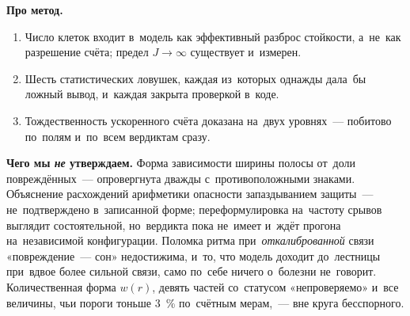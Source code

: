 \documentclass[11pt,a4paper,landscape,twocolumn]{article}
\begin{document}
\textbf{Про метод.}
\begin{enumerate}[leftmargin=1.3em,itemsep=2pt,topsep=2pt,resume]
\item Число клеток входит в~модель как эффективный разброс стойкости, а~не~как разрешение счёта; предел $J\to\infty$ существует и~измерен.
\item Шесть статистических ловушек, каждая из~которых однажды дала~бы ложный вывод, и~каждая закрыта проверкой в~коде.
\item Тождественность ускоренного счёта доказана на~двух уровнях~— побитово по~полям и~по~всем вердиктам сразу.
\end{enumerate}

\textbf{Чего мы \emph{не} утверждаем.} Форма зависимости ширины полосы от~доли повреждённых~— опровергнута дважды с~противоположными знаками. Объяснение расхождений арифметики опасности запаздыванием защиты~— не~подтверждено в~записанной форме; переформулировка на~частоту срывов выглядит состоятельной, но~вердикта пока не~имеет и~ждёт прогона на~независимой конфигурации. Поломка ритма при~\emph{откалиброванной} связи «повреждение~— сон» недостижима, и~то, что модель доходит до~лестницы при~вдвое более сильной связи, само по~себе ничего о~болезни не~говорит. Количественная форма $w(r)$, девять частей со~статусом «непроверяемо» и~все величины, чьи пороги тоньше 3~\% по~счётным мерам,~— вне круга бесспорного.

\end{document}
